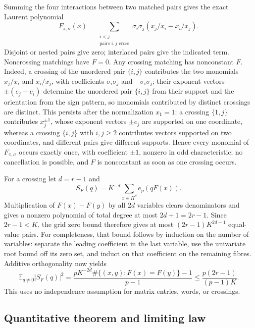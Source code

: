 Summing the four interactions between two matched pairs gives the exact Laurent polynomial \[
 F_{\pi,\sigma}(x)=\sum_{\substack{i<j\\\text{pairs }i,j\text{ cross}}}
 \sigma_i\sigma_j(x_j/x_i-x_i/x_j). \tag{MQ.16}
\] Disjoint or nested pairs give zero; interlaced pairs give the indicated term. Noncrossing matchings have \(F=0\). Any crossing matching has nonconstant \(F\). Indeed, a crossing of the unordered pair \(\{i,j\}\) contributes the two monomials \(x_j/x_i\) and \(x_i/x_j\), with coefficients \(\sigma_i\sigma_j\) and \(-\sigma_i\sigma_j\); their exponent vectors \(\pm(e_j-e_i)\) determine the unordered pair \(\{i,j\}\) from their support and the orientation from the sign pattern, so monomials contributed by distinct crossings are distinct. This persists after the normalization \(x_1=1\): a crossing \(\{1,j\}\) contributes \(x_j^{\pm1}\), whose exponent vectors \(\pm e_j\) are supported on one coordinate, whereas a crossing \(\{i,j\}\) with \(i,j\ge2\) contributes vectors supported on two coordinates, and different pairs give different supports. Hence every monomial of \(F_{\pi,\sigma}\) occurs exactly once, with coefficient \(\pm1\), nonzero in odd characteristic; no cancellation is possible, and \(F\) is nonconstant as soon as one crossing occurs.

For a crossing let \(d=r-1\) and \[
 S_F(q)=K^{-d}\sum_{x\in H^d}e_p(qF(x)).
\] Multiplication of \(F(x)-F(y)\) by all \(2d\) variables clears denominators and gives a nonzero polynomial of total degree at most \(2d+1=2r-1\). Since \(2r-1<K\), the grid zero bound therefore gives at most \((2r-1)K^{2d-1}\) equal-value pairs. For completeness, that bound follows by induction on the number of variables: separate the leading coefficient in the last variable, use the univariate root bound off its zero set, and induct on that coefficient on the remaining fibres. Additive orthogonality now yields \[
 \mathbb E_{q\ne0}|S_F(q)|^2
 =\frac{pK^{-2d}\#\{(x,y):F(x)=F(y)\}-1}{p-1}
 \leq\frac{p(2r-1)}{(p-1)K}. \tag{MQ.17}
\] This uses no independence assumption for matrix entries, words, or crossings.

\subsection{Quantitative theorem and limiting law}\label{magnetic:quantitative-theorem-and-limiting-law}

